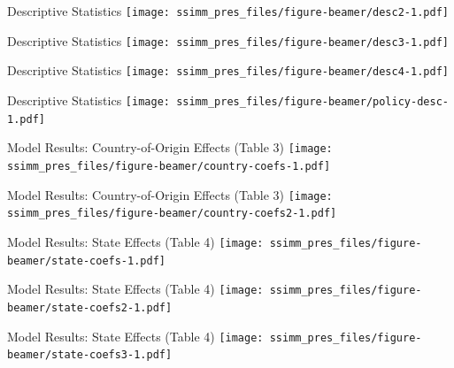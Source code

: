 \documentclass[
  ignorenonframetext,
]{beamer}
\begin{document}
\begin{frame}{Descriptive Statistics}
\protect\hypertarget{descriptive-statistics-1}{}
\texttt{[image: ssimm\_pres\_files/figure-beamer/desc2-1.pdf]}
\end{frame}

\begin{frame}{Descriptive Statistics}
\protect\hypertarget{descriptive-statistics-2}{}
\texttt{[image: ssimm\_pres\_files/figure-beamer/desc3-1.pdf]}
\end{frame}

\begin{frame}{Descriptive Statistics}
\protect\hypertarget{descriptive-statistics-3}{}
\texttt{[image: ssimm\_pres\_files/figure-beamer/desc4-1.pdf]}
\end{frame}

\begin{frame}{Descriptive Statistics}
\protect\hypertarget{descriptive-statistics-4}{}
\texttt{[image: ssimm\_pres\_files/figure-beamer/policy-desc-1.pdf]}
\end{frame}

\begin{frame}{Model Results: Country-of-Origin Effects (Table 3)}
\protect\hypertarget{model-results-country-of-origin-effects-table-3}{}
\texttt{[image: ssimm\_pres\_files/figure-beamer/country-coefs-1.pdf]}
\end{frame}

\begin{frame}{Model Results: Country-of-Origin Effects (Table 3)}
\protect\hypertarget{model-results-country-of-origin-effects-table-3-1}{}
\texttt{[image: ssimm\_pres\_files/figure-beamer/country-coefs2-1.pdf]}
\end{frame}

\begin{frame}{Model Results: State Effects (Table 4)}
\protect\hypertarget{model-results-state-effects-table-4}{}
\texttt{[image: ssimm\_pres\_files/figure-beamer/state-coefs-1.pdf]}
\end{frame}

\begin{frame}{Model Results: State Effects (Table 4)}
\protect\hypertarget{model-results-state-effects-table-4-1}{}
\texttt{[image: ssimm\_pres\_files/figure-beamer/state-coefs2-1.pdf]}
\end{frame}

\begin{frame}{Model Results: State Effects (Table 4)}
\protect\hypertarget{model-results-state-effects-table-4-2}{}
\texttt{[image: ssimm\_pres\_files/figure-beamer/state-coefs3-1.pdf]}
\end{frame}
\end{document}
